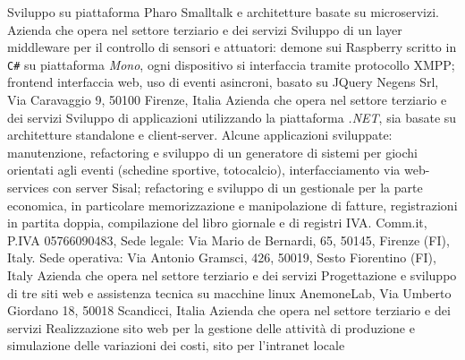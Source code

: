 \documentclass[totpages,openbib,italian]{europecv}
\begin{document}
\begin{europecv}
 {Sviluppo su piattaforma Pharo Smalltalk e architetture basate su microservizi.}
{Azienda che opera nel settore terziario e dei servizi} 
{Sviluppo di un layer middleware per il controllo di sensori e 
    attuatori: demone sui Raspberry scritto in \texttt{C\#} su
    piattaforma \emph{Mono}, ogni dispositivo si interfaccia
    tramite protocollo XMPP; frontend interfaccia web, uso di 
    eventi asincroni, basato su JQuery}
{Negens Srl, Via Caravaggio 9, 50100 Firenze, Italia}
{Azienda che opera nel settore terziario e dei servizi} 
{Sviluppo di applicazioni utilizzando la piattaforma \emph{.NET}, 
  sia basate su architetture standalone e client-server. Alcune applicazioni
  sviluppate: manutenzione, refactoring e sviluppo di un generatore di sistemi
  per giochi orientati agli eventi (schedine sportive, totocalcio), interfacciamento
  via web-services con server Sisal; refactoring e sviluppo di un gestionale 
  per la parte economica, in particolare memorizzazione e manipolazione
  di fatture, registrazioni in partita doppia, compilazione del libro giornale
  e di registri IVA.}
{Comm.it, P.IVA 05766090483, Sede legale: Via Mario de Bernardi, 65,
  50145, Firenze (FI), Italy. Sede operativa: Via Antonio Gramsci,
  426,
  50019, Sesto Fiorentino (FI), Italy }
{Azienda che opera nel settore terziario e dei servizi} 
{Progettazione e sviluppo di tre siti web e assistenza tecnica su
  macchine linux}
{AnemoneLab, Via Umberto Giordano 18, 50018 Scandicci, Italia}
{Azienda che opera nel settore terziario e dei servizi} 
{Realizzazione sito web per la gestione delle attivit\`a di produzione
  e simulazione delle variazioni dei costi, sito per l'intranet locale}

\end{europecv}
\end{document}
